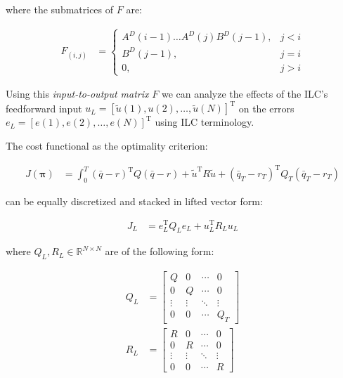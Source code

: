 \documentclass[10pt,a4paper]{article}
\newcommand{\joint}{q} %
\newcommand{\state}{\bar{\joint}} %
\newcommand{\error}{e} %
\newcommand{\traj}{r} %
\newcommand{\sysInput}{u} %
\newcommand{\linInput}{\tilde{u}} %
\newcommand{\policy}{\mathbf{\pi}}
\newcommand{\ValueFunction}{J}
\newcommand{\numSteps}{N} %
\begin{document}
where the submatrices of $F$ are:

\begin{equation*}
\begin{aligned}
F_{(i,j)} &= \left \{
\begin{array}{cc}
A^{D}(i-1)\ldots A^{D}(j)B^{D}(j-1), & j < i \\ 
B^{D}(j-1), & j = i \\
0, & j > i 
\end{array} \right.
\end{aligned}
\end{equation*}

Using this \emph{input-to-output matrix} $F$ we can analyze the effects of the ILC's feedforward input $\sysInput_L = [\linInput(1), \sysInput(2), \ldots, \linInput(\numSteps)]^{\mathrm{T}}$ on the errors $\error_L = [\error(1), \error(2),\ldots,\error(\numSteps)]^{\mathrm{T}}$ using ILC terminology.

The cost functional as the optimality criterion:

\begin{equation}
\begin{aligned}
\ValueFunction(\policy) &= \int_{0}^{T} (\state - \traj)^{\mathrm{T}}Q(\state - \traj) + \linInput^{\mathrm{T}}R\linInput + (\state_T-\traj_T)^{\mathrm{T}}Q_{T}(\state_T-\traj_T)
\end{aligned}
\label{cost}
\end{equation}

can be equally discretized and stacked in lifted vector form:

\begin{equation}
\begin{aligned}
\ValueFunction_L &= \error_L^{\mathrm{T}}Q_L\error_L + \sysInput_L^{\mathrm{T}}R_L\sysInput_L
\end{aligned}
\label{costFunctional}
\end{equation}

where $Q_L, R_L \in \mathbb{R}^{N \times N}$ are of the following form:

\begin{equation*}
\begin{aligned}
 Q_L &= 
 \begin{bmatrix}
  Q & 0 & \cdots & 0 \\
  0 & Q & \cdots & 0 \\
  \vdots  & \vdots  & \ddots & \vdots  \\
  0 & 0 & \cdots & Q_T
 \end{bmatrix} \\
 R_L &= 
  \begin{bmatrix}
   R & 0 & \cdots & 0 \\
   0 & R & \cdots & 0 \\
   \vdots  & \vdots  & \ddots & \vdots  \\
   0 & 0 & \cdots & R
  \end{bmatrix}
\end{aligned}
\end{equation*}
\end{document}
